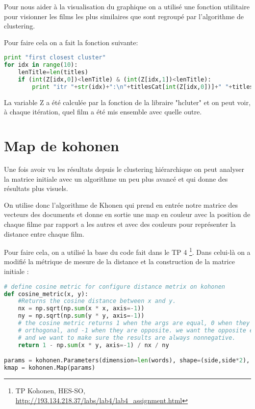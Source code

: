 Pour nous aider à la visualisation du graphique on a utilisé une fonction utilitaire pour visionner les films les plus similaires que sont regroupé par l'algorithme de clustering.

Pour faire cela on a fait la fonction suivante:

\begin{lstlisting}[language=python]
print "first closest cluster"
for idx in range(10):
    lenTitle=len(titles)
    if (int(Z[idx,0])<lenTitle) & (int(Z[idx,1])<lenTitle):
        print "itr "+str(idx)+":\n"+titlesCat[int(Z[idx,0])]+" "+titlesCat[int(Z[idx,1])]
\end{lstlisting}

La variable Z a été calculée par la fonction de la libraire "hcluter" et on peut voir, à chaque itération, quel film a été mis ensemble avec quelle outre.	


\section{Map de kohonen}

Une fois avoir vu les résultats depuis le clustering hiérarchique on peut analyser la matrice initiale avec un algorithme un peu plus avancé et qui donne des résultats plus visuels.

On utilise donc l'algorithme de Khonen qui prend en entrée notre matrice des vecteurs des documents et donne en sortie une map en couleur avec la position de chaque filme par rapport a les autres et avec des couleurs pour représenter la distance entre chaque film. 

Pour faire cela, on a utilisé la base du code fait dans le TP 
4 \footnote{TP Kohonen, HES-SO, \url{http://193.134.218.37/labs/lab4/lab4_assignment.html}}. Dans celui-là  on a modifié la métrique de mesure de la distance et la construction de la matrice initiale : 

\begin{lstlisting}[language=python]
# define cosine metric for configure distance metrix on kohonen
def cosine_metric(x, y):
	#Returns the cosine distance between x and y.
	nx = np.sqrt(np.sum(x * x, axis=-1))
	ny = np.sqrt(np.sum(y * y, axis=-1))
	# the cosine metric returns 1 when the args are equal, 0 when they are
	# orthogonal, and -1 when they are opposite. we want the opposite effect,
	# and we want to make sure the results are always nonnegative.
	return 1 - np.sum(x * y, axis=-1) / nx / ny

params = kohonen.Parameters(dimension=len(words), shape=(side,side*2), metric=cosine_metric)
kmap = kohonen.Map(params)
\end{lstlisting}




